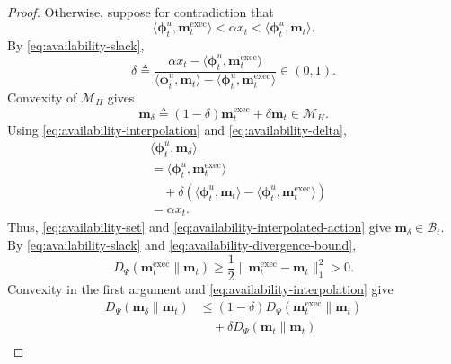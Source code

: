 \documentclass[journal]{IEEEtran}
\theoremstyle{remark}
\begin{document}
\begin{proof}
Otherwise, suppose for contradiction that
\begin{equation}
\label{eq:availability-slack}
\langle\boldsymbol{\phi}_t^u,\mathbf{m}_t^{\mathrm{exec}}\rangle
<\alpha x_t
<\langle\boldsymbol{\phi}_t^u,\mathbf{m}_t\rangle.
\end{equation}
By \eqref{eq:availability-slack},
\begin{equation}
\label{eq:availability-delta}
\delta\triangleq
\frac{\alpha x_t-
\langle\boldsymbol{\phi}_t^u,\mathbf{m}_t^{\mathrm{exec}}\rangle}
{\langle\boldsymbol{\phi}_t^u,\mathbf{m}_t\rangle-
\langle\boldsymbol{\phi}_t^u,\mathbf{m}_t^{\mathrm{exec}}\rangle}
\in(0,1).
\end{equation}
Convexity of $\mathcal{M}_H$ gives
\begin{equation}
\label{eq:availability-interpolation}
\mathbf{m}_\delta
\triangleq
(1-\delta)\mathbf{m}_t^{\mathrm{exec}}+\delta\mathbf{m}_t
\in\mathcal{M}_H.
\end{equation}
Using \eqref{eq:availability-interpolation} and
\eqref{eq:availability-delta},
\begin{equation}
\label{eq:availability-interpolated-action}
\begin{aligned}
&\langle\boldsymbol{\phi}_t^u,\mathbf{m}_\delta\rangle \\
&=
\langle\boldsymbol{\phi}_t^u,\mathbf{m}_t^{\mathrm{exec}}\rangle
\\
&\quad+\delta\left(
\langle\boldsymbol{\phi}_t^u,\mathbf{m}_t\rangle-
\langle\boldsymbol{\phi}_t^u,\mathbf{m}_t^{\mathrm{exec}}\rangle
\right)\\
&=\alpha x_t.
\end{aligned}
\end{equation}
Thus, \eqref{eq:availability-set} and
\eqref{eq:availability-interpolated-action} give
$\mathbf{m}_\delta\in\mathcal{B}_t$.
By \eqref{eq:availability-slack} and
\eqref{eq:availability-divergence-bound},
\begin{equation}
\label{eq:availability-positive-divergence}
D_\Psi(\mathbf{m}_t^{\mathrm{exec}}\|\mathbf{m}_t)
\ge\frac12\|\mathbf{m}_t^{\mathrm{exec}}-\mathbf{m}_t\|_1^2>0.
\end{equation}
Convexity in the first argument and
\eqref{eq:availability-interpolation} give
\begin{align*}
D_\Psi(\mathbf{m}_\delta\|\mathbf{m}_t)
&\le
(1-\delta)D_\Psi(\mathbf{m}_t^{\mathrm{exec}}\|\mathbf{m}_t)
\\
&\quad+\delta D_\Psi(\mathbf{m}_t\|\mathbf{m}_t) \\

\end{align*}
\end{proof}
\end{document}
